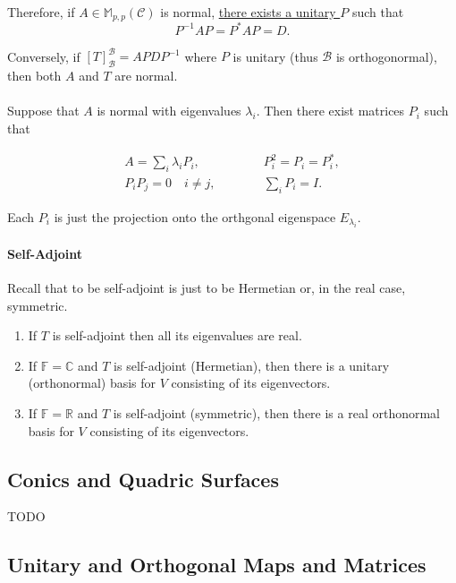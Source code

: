 Therefore, if \( A \in \mathbb{M}_{p, p}(\mathcal{C}) \) is normal,
\underline{there exists a unitary \( P \)} such that \[
    P^{-1} A P = P^* A P = D.
\]

Conversely, if \( {[T]}_{\mathcal{B}}^{\mathcal{B}} = A  PDP^{-1} \)
where \( P \) is unitary (thus \( \mathcal{B} \) is orthogonormal),
then both \( A \) and \( T \) are normal.

\paragraph{}
Suppose that \( A \) is normal with eigenvalues \( \lambda_i \).
Then there exist matrices \( P_i \) such that

\begin{align*}
    A = \sum_{i} \lambda_i P_i, &\quad\quad\quad P^2_i = P_i = P_i^*,   \\
    P_i P_j = 0 \quad i \neq j, &\quad\quad\quad \sum_{i} P_i = I.
\end{align*}

Each \( P_i \) is just the projection onto the orthgonal eigenspace \( E_{\lambda_i} \).

\paragraph{Self-Adjoint}
Recall that to be self-adjoint is just to be Hermetian or, in the real
case, symmetric.
\begin{enumerate}
    \item If \( T \) is self-adjoint then all its eigenvalues are real.
    \item If \( \mathbb{F} = \mathbb{C} \) and \( T \) is self-adjoint (Hermetian),
        then there is a unitary (orthonormal) basis for \( V \) 
        consisting of its eigenvectors.
    \item If \( \mathbb{F} = \mathbb{R} \) and \( T \) is self-adjoint (symmetric),
        then there is a real orthonormal basis for \( V \) consisting of its
        eigenvectors.
\end{enumerate}

%
%
%
\subsection{Conics and Quadric Surfaces}
TODO

%
%
%
\subsection{Unitary and Orthogonal Maps and Matrices}
